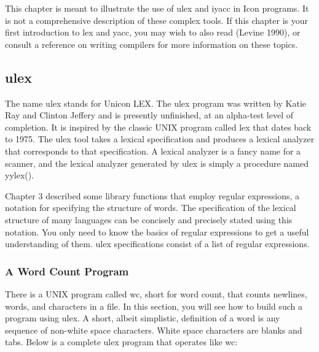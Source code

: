 This chapter is meant to illustrate the use of \textsf{ulex} and
\textsf{iyacc} in Icon programs. It is not a comprehensive description
of these complex tools. If this chapter is your first introduction to
\textsf{lex} and \textsf{yacc}, you may wish to also read (Levine
1990), or consult a reference on writing compilers for more information
on these topics.

\subsection{ulex}

The name \textsf{ulex} stands for Unicon LEX. The 
\textsf{ulex} program was written by Katie Ray and Clinton Jeffery
and is presently unfinished, at an alpha-test level of completion.
It is inspired by
the classic UNIX program called \textsf{lex} that dates back to 1975. The
\textsf{ulex} tool takes a lexical specification and produces a lexical
analyzer that corresponds to that specification. A lexical analyzer is a fancy name for a scanner, and the
lexical analyzer generated by \textsf{ulex} is simply a procedure named
\textsf{yylex()}.


Chapter 3 described some library functions that employ regular expressions, a notation for specifying the structure
of words. The specification of the lexical structure of many languages
can be concisely and precisely stated using this notation. You only
need to know the basics of regular expressions to get a useful
understanding of them. \textsf{ulex} specifications consist of a list
of regular expressions.

\subsubsection{A Word Count Program}

There is a UNIX program called \textsf{wc}, short for word count, that counts newlines, words, and characters in a
file. In this section, you will see how to build such a program using
\textsf{ulex}. A short, albeit simplistic, definition of a word is any
sequence of non-white space characters. White space characters are
blanks and tabs. Below is a complete \textsf{ulex} program that
operates like \textsf{wc}:\\



